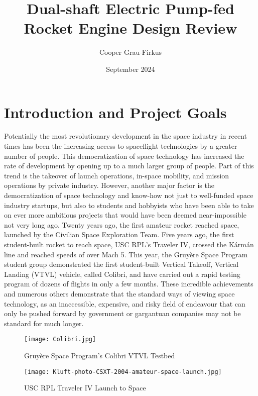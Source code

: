 \documentclass[12pt, letterpaper]{article}
\title{Dual-shaft Electric Pump-fed Rocket Engine Design Review}
\author{Cooper Grau-Firkus}
\date{September 2024}
\begin{document}
\maketitle
\tableofcontents

\section{Introduction and Project Goals}

Potentially the most revolutionary development in the space industry in recent times has been the increasing access to spaceflight technologies by a greater number of people. This democratization of space technology has increased the rate of development by opening up to a much larger group of people. Part of this trend is the takeover of launch operations, in-space mobility, and mission operations by private industry. However, another major factor is the democratization of space technology and know-how not just to well-funded space industry startups, but also to students and hobbyists who have been able to take on ever more ambitious projects that would have been deemed near-impossible not very long ago. Twenty years ago, the first amateur rocket reached space, launched by the Civilian Space Exploration Team. Five years ago, the first student-built rocket to reach space, USC RPL's Traveler IV, crossed the Kármán line and reached speeds of over Mach 5. This year, the Gruyère Space Program student group demonstrated the first student-built Vertical Takeoff, Vertical Landing (VTVL) vehicle, called Colibri, and have carried out a rapid testing program of dozens of flights in only a few months. These incredible achievements and numerous others demonstrate that the standard ways of viewing space technology, as an inaccessible, expensive, and risky field of endeavour that can only be pushed forward by government or gargantuan companies may not be standard for much longer.
\begin{figure}[!b]
    \centering
    \texttt{[image: Colibri.jpg]}
    \caption{Gruyère Space Program's Colibri VTVL Testbed}
\end{figure}

\begin{figure}
    \centering
    \texttt{[image: Kluft-photo-CSXT-2004-amateur-space-launch.jpg]}
    \caption{USC RPL Traveler IV Launch to Space}
\end{figure}

    
\newpage
\end{document}
